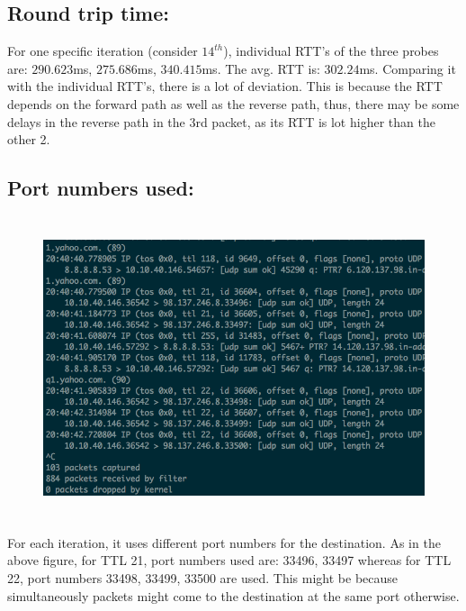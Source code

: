 \documentclass[]{report}
\begin{document}
\subsection{Round trip time:}
For one specific iteration (consider $14^{th}$), individual RTT's of the three probes are: $290.623$ms, $275.686$ms, $340.415$ms. The avg. RTT is: $302.24$ms. Comparing it with the individual RTT's, there is a lot of deviation. This is because the RTT depends on the forward path as well as the reverse path, thus, there may be some delays in the reverse path in the 3rd packet, as its RTT is lot higher than the other 2. 

\subsection{Port numbers used:}
\begin{figure}[H]
	\vspace{0pt}
	\includegraphics[height = 250pt, keepaspectratio]{Snapshots/exe3/q3_3.png}
\end{figure}

For each iteration, it uses different port numbers for the destination. As in the above figure, for TTL 21, port numbers used are: 33496, 33497 whereas for TTL 22, port numbers 33498,  33499, 33500 are used.  This might be because simultaneously packets might come to the destination at the same port otherwise. 

\end{document}
